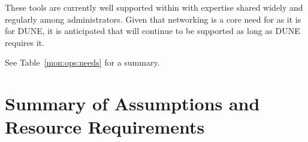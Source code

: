 \documentclass[../main-v1.tex]{subfiles}
\begin{document}
These tools are currently well supported within  with %
expertise shared widely and regularly among administrators.
Given %
that networking is a core need for  as it is for DUNE, it is anticipated that  %
will continue to be supported %
as long as DUNE requires it.

See Table~\ref{mon:ops:needs} for a summary.











\section{Summary of Assumptions and Resource Requirements}

%
\end{document}
